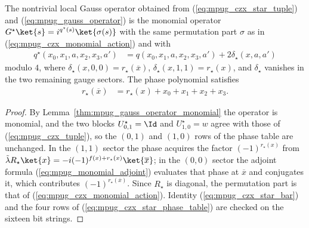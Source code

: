 \begin{lemma}
    \label{thm:mpug_czx_star_local_monomial_action}
    \leanok
    The nontrivial local Gauss operator obtained from
    (\ref{eq:mpug_czx_star_tuple}) and (\ref{eq:mpug_gauss_operator}) is the
    monomial operator $G^\star\ket{s}=i^{q^\star(s)}\ket{\sigma(s)}$ with the
    same permutation part $\sigma$ as in
    (\ref{eq:mpug_czx_monomial_action}) and with
    \begin{align}
        q^\star(x_0,x_1,a,x_2,x_3,a') & =q(x_0,x_1,a,x_2,x_3,a')
        +2\delta_\star(x,a,a')
        \label{eq:mpug_czx_star_phase_table}
    \end{align}
    modulo $4$, where $\delta_\star(x,0,0)=r_\star(\overline x)$,
    $\delta_\star(x,1,1)=r_\star(x)$, and $\delta_\star$ vanishes in the two
    remaining gauge sectors. The phase polynomial satisfies
    \begin{align}
        r_\star(\overline x) & =r_\star(x)+x_0+x_1+x_2+x_3.
        \label{eq:mpug_czx_star_bar}
    \end{align}
\end{lemma}

\begin{proof}\leanok
    By Lemma~\ref{thm:mpug_gauss_operator_monomial} the operator is monomial,
    and the two blocks $U^\star_{0,1}=\Id$ and $U^\star_{1,0}=w$ agree with
    those of (\ref{eq:mpug_czx_tuple}), so the $(0,1)$ and $(1,0)$ rows of the
    phase table are unchanged. In the $(1,1)$ sector the phase acquires the
    factor $(-1)^{r_\star(x)}$ from
    $\tilde\lambda R_\star\ket{x}=-i(-1)^{f(x)+r_\star(x)}\ket{\overline x}$; in
    the $(0,0)$ sector the adjoint formula
    (\ref{eq:mpug_monomial_adjoint}) evaluates that phase at $\overline x$ and
    conjugates it, which contributes $(-1)^{r_\star(\overline x)}$. Since
    $R_\star$ is diagonal, the permutation part is that of
    (\ref{eq:mpug_czx_monomial_action}). Identity
    (\ref{eq:mpug_czx_star_bar}) and the four rows of
    (\ref{eq:mpug_czx_star_phase_table}) are checked on the sixteen bit
    strings.
\end{proof}

